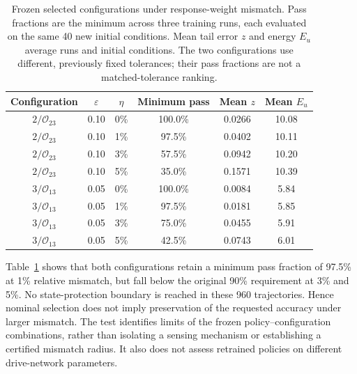 \begin{table}[pos=!t,width=\textwidth]
\centering
\caption{Frozen selected configurations under response-weight mismatch. Pass fractions are the minimum across three training runs, each evaluated on the same 40 new initial conditions. Mean tail error $z$ and energy $E_u$ average runs and initial conditions. The two configurations use different, previously fixed tolerances; their pass fractions are not a matched-tolerance ranking.}
\label{tab:configuration_transfer}
\small
\begin{tabular}{cccccc}
\toprule
Configuration & $\varepsilon$ & $\eta$ & Minimum pass & Mean $z$ & Mean $E_u$\\
\midrule
$2/\mathcal O_{23}$ & 0.10 & 0\% & 100.0\% & 0.0266 & 10.08\\
$2/\mathcal O_{23}$ & 0.10 & 1\% & 97.5\% & 0.0402 & 10.11\\
$2/\mathcal O_{23}$ & 0.10 & 3\% & 57.5\% & 0.0942 & 10.20\\
$2/\mathcal O_{23}$ & 0.10 & 5\% & 35.0\% & 0.1571 & 10.39\\
$3/\mathcal O_{13}$ & 0.05 & 0\% & 100.0\% & 0.0084 & 5.84\\
$3/\mathcal O_{13}$ & 0.05 & 1\% & 97.5\% & 0.0181 & 5.85\\
$3/\mathcal O_{13}$ & 0.05 & 3\% & 75.0\% & 0.0455 & 5.91\\
$3/\mathcal O_{13}$ & 0.05 & 5\% & 42.5\% & 0.0743 & 6.01\\
\bottomrule
\end{tabular}
\end{table}

Table~\ref{tab:configuration_transfer} shows that both configurations retain a minimum pass fraction of 97.5\% at 1\% relative mismatch, but fall below the original 90\% requirement at 3\% and 5\%. No state-protection boundary is reached in these 960 trajectories. Hence nominal selection does not imply preservation of the requested accuracy under larger mismatch. The test identifies limits of the frozen policy--configuration combinations, rather than isolating a sensing mechanism or establishing a certified mismatch radius. It also does not assess retrained policies on different drive-network parameters.
